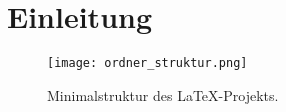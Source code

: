 \section{Einleitung}


\begin{figure}
\centering
\texttt{[image: ordner\_struktur.png]}
\caption{Minimalstruktur des \LaTeX -Projekts.}\label{fig:Struktur}
\end{figure}

